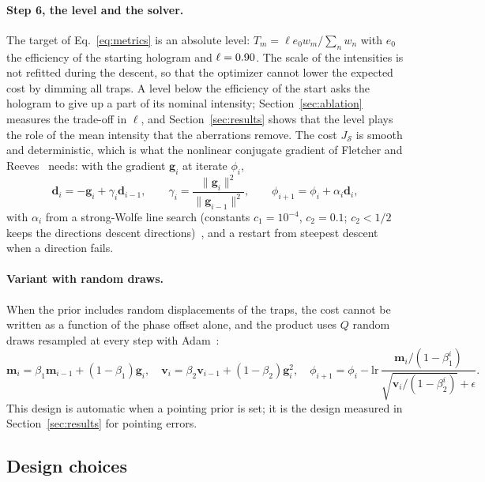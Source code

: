 \paragraph{Step 6, the level and the solver.} The target of Eq.~\eqref{eq:metrics} is an absolute level: $T_m=\ell e_0w_m/\sum_nw_n$ with $e_0$ the efficiency of the starting hologram and $\ell=0.90$. The scale of the intensities is not refitted during the descent, so that the optimizer cannot lower the
expected cost by dimming all traps. A level below the efficiency of the start asks the hologram to give up a part of its nominal intensity; Section~\ref{sec:ablation} measures the trade-off in $\ell$, and Section~\ref{sec:results} shows that the level plays the role of the mean intensity that the aberrations remove. The cost $J_{\mathcal S}$ is smooth and deterministic, which is what the nonlinear conjugate gradient of Fletcher and
Reeves~\cite{fletcher1964} needs: with the gradient $\mathbf g_i$ at iterate $\phi_i$,
\begin{equation}
\mathbf d_i=-\mathbf g_i+\gamma_i\mathbf d_{i-1},\qquad \gamma_i=\frac{\|\mathbf g_i\|^2}{\|\mathbf g_{i-1}\|^2},\qquad \phi_{i+1}=\phi_i+\alpha_i\mathbf d_i,\label{eq:cg}
\end{equation}
with $\alpha_i$ from a strong-Wolfe line search (constants $c_1=10^{-4}$, $c_2=0.1$; $c_2<1/2$ keeps the directions descent directions)~\cite{nocedal2006}, and a restart from steepest descent when a direction fails.

\paragraph{Variant with random draws.} When the prior includes random displacements of the traps, the cost cannot be written as a function of the phase offset alone, and the product uses $Q$ random draws resampled at every step with Adam~\cite{kingma2015}:
\begin{equation}
\mathbf m_i=\beta_1\mathbf m_{i-1}+(1-\beta_1)\mathbf g_i,\quad \mathbf v_i=\beta_2\mathbf v_{i-1}+(1-\beta_2)\mathbf g_i^2,\quad \phi_{i+1}=\phi_i-\mathrm{lr}\,\frac{\mathbf m_i/(1-\beta_1^i)}{\sqrt{\mathbf v_i/(1-\beta_2^i)}+\epsilon}.\label{eq:adam}
\end{equation}
This design is automatic when a pointing prior is set; it is the design measured in Section~\ref{sec:results} for pointing errors.

\subsection{Design choices}


